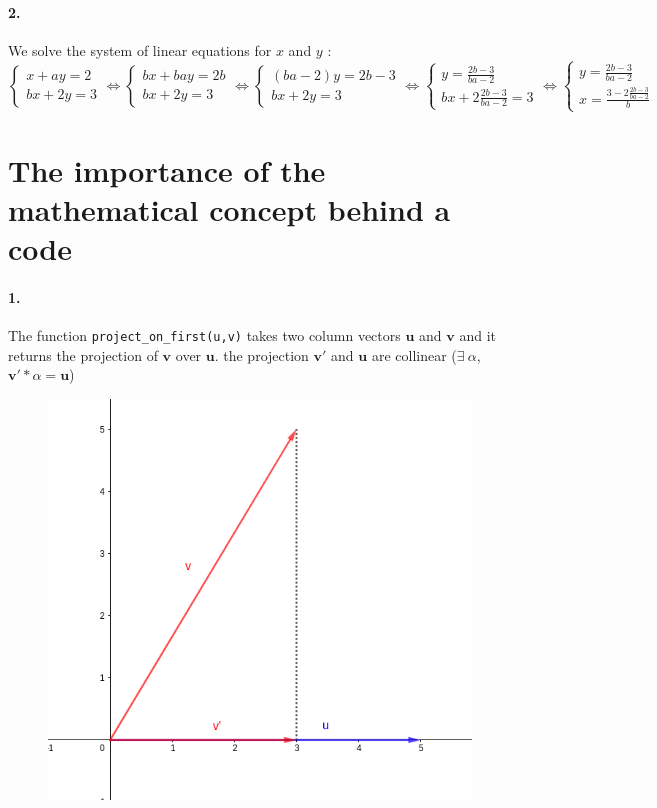 \documentclass[14pt]
{article}
\begin{document}
\paragraph*{2.} We solve the system of linear equations for $x$ and $y$ :\\
$\begin{cases}x+ay=2\\bx+2y=3\end{cases} \Leftrightarrow \begin{cases}bx+bay=2b\\bx+2y=3\end{cases} \Leftrightarrow \begin{cases}(ba-2)y=2b-3\\bx+2y=3\end{cases} \Leftrightarrow \begin{cases}y=\frac{2b-3}{ba-2}\\bx+2\frac{2b-3}{ba-2}=3\end{cases} \Leftrightarrow \begin{cases}y=\frac{2b-3}{ba-2}\\x=\frac{3-2\frac{2b-3}{ba-2}}{b}\end{cases}$

\section{The importance of the mathematical concept behind a
code} %
\bigskip
\paragraph*{1.} The function \texttt{project\_on\_first(u,v)} takes two column vectors $\mathbf{u}$ and $\mathbf{v}$ and it returns the projection of $\mathbf{v}$ over $\mathbf{u}$. the projection $\mathbf{v'}$ and $\mathbf{u}$ are collinear ($\exists\ \alpha$, $\mathbf{v'}*\alpha = \mathbf{u}$)\\
\begin{figure}[h]
\centering
\includegraphics[scale=0.3]{ab.png}
\end{figure}
\end{document}
